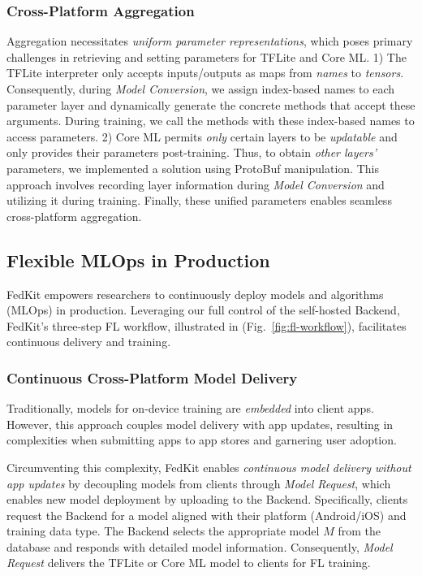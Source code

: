 \documentclass[letterpaper]{article} %
\begin{document}
\subsubsection{Cross-Platform Aggregation}
Aggregation necessitates
\textit{uniform parameter representations},
which poses primary challenges in
retrieving and setting parameters for TFLite and Core ML.
1)
The TFLite interpreter only accepts inputs/outputs as maps from \textit{names} to
\textit{tensors}.
Consequently, during \textit{Model Conversion},
we assign index-based names to each parameter layer and
dynamically generate the concrete methods that accept these arguments.
During training, we call the methods with these index-based names to
access parameters.
2)
Core ML permits \textit{only} certain layers to be \textit{updatable} and
only provides their parameters post-training.
Thus, to obtain \textit{other layers'} parameters,
we implemented a solution using ProtoBuf manipulation.
This approach involves recording layer information
during \textit{Model Conversion} and
utilizing it during training.
Finally, these unified parameters enables seamless cross-platform aggregation.

\subsection{Flexible MLOps in Production}
\newcommand{\model}{$M$}
\newcommand{\fs}{$S_\mathrm F$}
FedKit empowers researchers to continuously deploy models and algorithms (MLOps)
in production.
Leveraging our full control of the self-hosted Backend,
FedKit's three-step FL workflow, illustrated in (Fig.~\ref{fig:fl-workflow}),
facilitates continuous delivery and training.
\subsubsection{Continuous Cross-Platform Model Delivery}
Traditionally, models for on-device training are \textit{embedded} into client apps.
However, this approach couples model delivery with app updates, 
resulting in complexities when submitting apps to app stores and garnering user adoption.

Circumventing this complexity,
FedKit enables \textit{continuous model delivery without app updates} by
decoupling models from clients through \textit{Model Request},
which enables new model deployment by uploading to the Backend.
Specifically, clients request the Backend for a model aligned with
their platform (Android/iOS) and training data type.
The Backend selects the appropriate model \model{} from the database and
responds with detailed model information.
Consequently, \textit{Model Request} delivers the TFLite or Core ML model
to clients for FL training.
\end{document}
